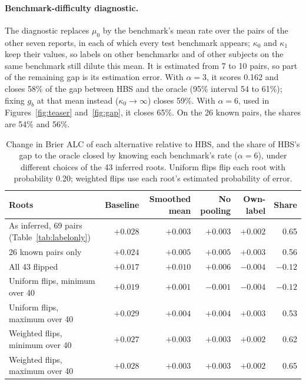 \documentclass{article}
\begin{document}
\paragraph{Benchmark-difficulty diagnostic.} The diagnostic replaces $\mu_0$ by the benchmark's mean rate over the pairs of the other seven reports, in each of which every test benchmark appears; $\kappa_0$ and $\kappa_1$ keep their values, so labels on other benchmarks and of other subjects on the same benchmark still dilute this mean. It is estimated from 7 to 10 pairs, so part of the remaining gap is its estimation error. With $\alpha = 3$, it scores 0.162 and closes 58\% of the gap between HBS and the oracle (95\% interval 54 to 61\%); fixing $g_b$ at that mean instead ($\kappa_0 \to \infty$) closes 59\%. With $\alpha = 6$, used in Figures~\ref{fig:teaser} and~\ref{fig:gap}, it closes 65\%. On the 26 known pairs, the shares are 54\% and 56\%.

\begin{table}[ht]
  \caption{Change in Brier ALC of each alternative relative to HBS, and the share of HBS's gap to the oracle closed by knowing each benchmark's rate ($\alpha = 6$), under different choices of the 43 inferred roots. Uniform flips flip each root with probability 0.20; weighted flips use each root's estimated probability of error.}
  \label{tab:roots}
  \centering
  \small
  \begin{tabular}{lrrrrr}
    \toprule
    Roots & Baseline & Smoothed mean & No pooling & Own-label & Share \\
    \midrule
    As inferred, 69 pairs (Table~\ref{tab:labelonly}) & $+0.028$ & $+0.003$ & $+0.003$ & $+0.002$ & 0.65 \\
    26 known pairs only & $+0.024$ & $+0.005$ & $+0.005$ & $+0.003$ & 0.56 \\
    All 43 flipped & $+0.017$ & $+0.010$ & $+0.006$ & $-0.004$ & $-0.12$ \\
    Uniform flips, minimum over 40 & $+0.019$ & $+0.001$ & $-0.001$ & $-0.004$ & $-0.12$ \\
    Uniform flips, maximum over 40 & $+0.029$ & $+0.004$ & $+0.004$ & $+0.003$ & 0.53 \\
    Weighted flips, minimum over 40 & $+0.027$ & $+0.003$ & $+0.003$ & $+0.002$ & 0.62 \\
    Weighted flips, maximum over 40 & $+0.028$ & $+0.003$ & $+0.003$ & $+0.002$ & 0.65 \\
    \bottomrule
  \end{tabular}
\end{table}
\end{document}
